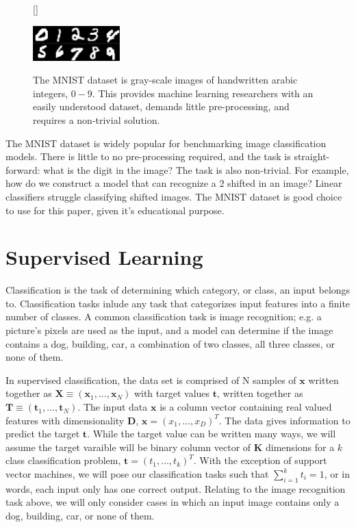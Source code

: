 \documentclass[11pt]{article}
\begin{document}
\begin{figure}[H]
  [\FBwidth]
  {\caption{The MNIST dataset is gray-scale images of handwritten arabic integers, $0 - 9$. This provides machine learning researchers with an easily understood dataset, demands little pre-processing, and requires a non-trivial solution.
    }\label{fig:mnist_ex}}{\includegraphics[width=0.3\textwidth]{img_mnist}}
\end{figure}

The MNIST dataset is widely popular for benchmarking image classification models. There is little to no pre-processing required, and the task is straight-forward: what is the digit in the image? The task is also non-trivial. For example, how do we construct a model that can recognize a $2$ shifted in an image? Linear classifiers struggle classifying shifted images. The MNIST dataset is good choice to use for this paper, given it's educational purpose.

\section{Supervised Learning}

\par
Classification is the task of determining which category, or class, an input belongs to. Classification tasks inlude any task that categorizes input features into a finite number of classes. A common classification task is image recognition; e.g. a picture's pixels are used as the input, and a model can determine if the image contains a dog, building, car, a combination of two classes, all three classes, or none of them.

In supervised classification, the data set is comprised of N samples of $\mathbf{x}$ written together as $\mathbf{X} \equiv (\mathbf{x}_{1},\ldots,\mathbf{x}_{N})$ with target values $\mathbf{t}$, written together as $\mathbf{T} \equiv (\mathbf{t}_{1},\ldots,\mathbf{t}_{N})$. The input data $\mathbf{x}$ is a column vector containing real valued features with dimensionality \textbf{D}, $\mathbf{x} = (x_{1},\ldots,x_{D})^{T}$. The data gives information to predict the target $\mathbf{t}$. While the target value can be written many ways, we will assume the target varaible will be binary column vector of \textbf{K} dimensions for a $k$ class classification problem, $\mathbf{t} = (t_{1},\ldots,t_{k})^{T}$. With the exception of support vector machines, we will pose our classification tasks such that $\sum_{i=1}^{k} t_{i} = 1$, or in words, each input only has one correct output. Relating to the image recognition task above, we will only consider cases in which an input image contains only a dog, building, car, or none of them.
\end{document}
